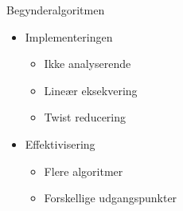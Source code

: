 \begin{frame}{Begynderalgoritmen}
\begin{itemize}
	\item Implementeringen
	\begin{itemize}
		\item Ikke analyserende
		\item Line\ae{}r eksekvering
		\item Twist reducering
	\end{itemize}
	\item Effektivisering
	\begin{itemize}
		\item Flere algoritmer
		\item Forskellige udgangspunkter
	\end{itemize}
\end{itemize}
\end{frame}